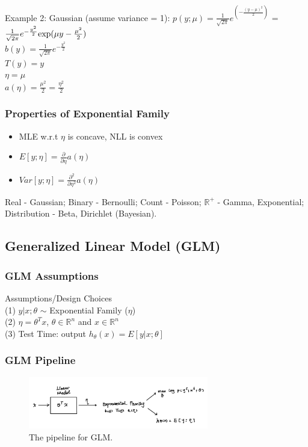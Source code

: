 \documentclass{article}
\begin{document}
\noindent
Example 2:
Gaussian (assume variance = 1): $p(y;\mu) = \frac{1}{\sqrt{2\pi}}e^{(-\frac{(y-\mu)^2}{2})}$
= $\frac{1}{\sqrt{2\pi}}e^{-\frac{y^2}{2}}{\rm exp}(\mu y-\frac{\mu^2}{2})$\\
$b(y) = \frac{1}{\sqrt{2\pi}}e^{-\frac{y^2}{2}}$\\
$T(y) = y$\\
$\eta = \mu$\\
$a(\eta) = \frac{\mu^2}{2} = \frac{\eta^2}{2}$\\

\subsubsection{Properties of Exponential Family}
\begin{itemize}[leftmargin=*, nosep]
  \item MLE w.r.t $\eta$ is concave, NLL is convex
  \item $E[y;\eta] = \frac{\partial}{\partial\eta}a(\eta)$
  \item $Var[y;\eta] = \frac{\partial^2}{\partial\eta^2}a(\eta)$
\end{itemize}
Real - Gaussian; Binary - Bernoulli; Count - Poisson; $\mathbb{R}^{+}$ - Gamma, Exponential; Distribution - Beta, Dirichlet (Bayesian).
\subsection{Generalized Linear Model (GLM)}
\subsubsection{GLM Assumptions}
Assumptions/Design Choices\\
(1) $y|x;\theta$ $\sim$ Exponential Family ($\eta$) \\
(2) $\eta = \theta^Tx$, $\theta \in \mathbb{R}^n$ and $x \in \mathbb{R}^n$ \\
(3) Test Time: output $h_\theta(x) = E[y|x;\theta]$
\subsubsection{GLM Pipeline}
\begin{figure}[H]
	\centerline{
   \includegraphics[width=0.7\textwidth]{Fig4.png}}
   \caption{The pipeline for GLM.}
   \label{fig:example}
\end{figure}
\end{document}
